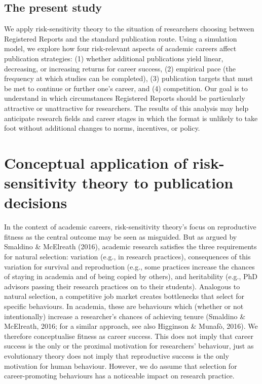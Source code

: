 \documentclass[
  british,
  a4paper,
  ,man,mask,floatsintext]{apa6}
\begin{document}
\subsection{The present study}\label{the-present-study}

We apply risk-sensitivity theory to the situation of researchers choosing between Registered Reports and the standard publication route.
Using a simulation model, we explore how four risk-relevant aspects of academic careers affect publication strategies:
(1) whether additional publications yield linear, decreasing, or increasing returns for career success, (2) empirical pace (the frequency at which studies can be completed), (3) publication targets that must be met to continue or further one's career, and (4) competition.
Our goal is to understand in which circumstances Registered Reports should be particularly attractive or unattractive for researchers.
The results of this analysis may help anticipate research fields and career stages in which the format is unlikely to take foot without additional changes to norms, incentives, or policy.

\section{Conceptual application of risk-sensitivity theory to publication decisions}\label{conceptual-application-of-risk-sensitivity-theory-to-publication-decisions}

In the context of academic careers, risk-sensitivity theory's focus on reproductive fitness as the central outcome may be seen as misguided.
But as argued by Smaldino \& McElreath (2016), academic research satisfies the three requirements for natural selection: variation (e.g., in research practices), consequences of this variation for survival and reproduction (e.g., some practices increase the chances of staying in academia and of being copied by others), and heritability (e.g., PhD advisors passing their research practices on to their students).
Analogous to natural selection, a competitive job market creates bottlenecks that select for specific behaviours.
In academia, these are behaviours which (whether or not intentionally) increase a researcher's chances of achieving tenure (Smaldino \& McElreath, 2016; for a similar approach, see also Higginson \& Munafò, 2016).
We therefore conceptualise fitness as career success.
This does not imply that career success is the only or the proximal motivation for researchers' behaviour, just as evolutionary theory does not imply that reproductive success is the only motivation for human behaviour.
However, we do assume that selection for career-promoting behaviours has a noticeable impact on research practice.
\end{document}
